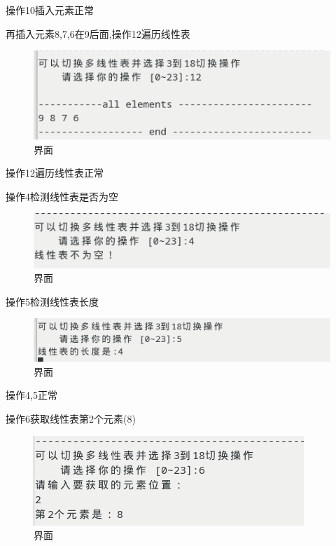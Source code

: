 \documentclass[supercite]{Experimental_Report}
\theoremstyle{definition}
\begin{document}
操作10插入元素正常

再插入元素8,7,6在9后面,操作12遍历线性表

\begin{figure}[!htb]
	\begin{center}
		\includegraphics[scale=0.60]{images/1-11.png}
		\caption{界面}
		\label{fig1-11}
		\end{center}
\end{figure}

操作12遍历线性表正常

操作4检测线性表是否为空

\begin{figure}[!htb]
	\begin{center}
		\includegraphics[scale=0.60]{images/1-12.png}
		\caption{界面}
		\label{fig1-12}
		\end{center}
\end{figure}

操作5检测线性表长度

\begin{figure}[!htb]
	\begin{center}
		\includegraphics[scale=0.60]{images/1-13.png}
		\caption{界面}
		\label{fig1-13}
		\end{center}
\end{figure}

操作4,5正常

操作6获取线性表第2个元素(8)

\begin{figure}[!htb]
	\begin{center}
		\includegraphics[scale=0.60]{images/1-14.png}
		\caption{界面}
		\label{fig1-14}
		\end{center}
\end{figure}
\end{document}
